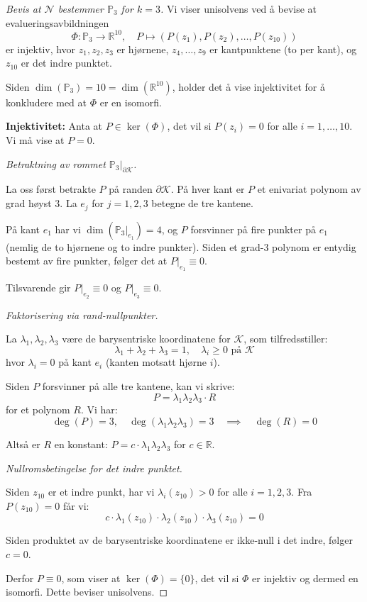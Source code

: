 \documentclass[../../main.tex]{subfiles}
\begin{document}
\begin{proof}[Bevis at $\mathcal{N}$ bestemmer $\mathbb{P}_3$ for $k=3$]
Vi viser unisolvens ved å bevise at evalueringsavbildningen
\[
    \Phi: \mathbb{P}_3 \to \mathbb{R}^{10}, \quad P \mapsto (P(z_1), P(z_2), \ldots, P(z_{10}))
\]
er injektiv, hvor $z_1, z_2, z_3$ er hjørnene, $z_4, \ldots, z_9$ er kantpunktene (to per kant), og $z_{10}$ er det indre punktet.

Siden $\dim(\mathbb{P}_3) = 10 = \dim(\mathbb{R}^{10})$, holder det å vise injektivitet for å konkludere med at $\Phi$ er en isomorfi.

\textbf{Injektivitet:} Anta at $P \in \ker(\Phi)$, det vil si $P(z_i) = 0$ for alle $i = 1, \ldots, 10$. Vi må vise at $P = 0$.

\textit{Betraktning av rommet $\mathbb{P}_3|_{\partial \mathcal{K}}$.}

La oss først betrakte $P$ på randen $\partial \mathcal{K}$. På hver kant er $P$ et enivariat polynom av grad høyst 3. La $e_j$ for $j = 1, 2, 3$ betegne de tre kantene.

På kant $e_1$ har vi $\dim(\mathbb{P}_3|_{e_1}) = 4$, og $P$ forsvinner på fire punkter på $e_1$ (nemlig de to hjørnene og to indre punkter). Siden et grad-3 polynom er entydig bestemt av fire punkter, følger det at $P|_{e_1} \equiv 0$.

Tilsvarende gir $P|_{e_2} \equiv 0$ og $P|_{e_3} \equiv 0$.

\textit{Faktorisering via rand-nullpunkter.}

La $\lambda_1, \lambda_2, \lambda_3$ være de barysentriske koordinatene for $\mathcal{K}$, som tilfredsstiller:
\[
    \lambda_1 + \lambda_2 + \lambda_3 = 1, \quad \lambda_i \geq 0 \text{ på } \mathcal{K}
\]
hvor $\lambda_i = 0$ på kant $e_i$ (kanten motsatt hjørne $i$).

Siden $P$ forsvinner på alle tre kantene, kan vi skrive:
\[
    P = \lambda_1 \lambda_2 \lambda_3 \cdot R
\]
for et polynom $R$. Vi har:
\[
    \deg(P) = 3, \quad \deg(\lambda_1 \lambda_2 \lambda_3) = 3 \quad \implies \quad \deg(R) = 0
\]

Altså er $R$ en konstant: $P = c \cdot \lambda_1 \lambda_2 \lambda_3$ for $c \in \mathbb{R}$.

\textit{Nullromsbetingelse for det indre punktet.}

Siden $z_{10}$ er et indre punkt, har vi $\lambda_i(z_{10}) > 0$ for alle $i = 1, 2, 3$. Fra $P(z_{10}) = 0$ får vi:
\[
    c \cdot \lambda_1(z_{10}) \cdot \lambda_2(z_{10}) \cdot \lambda_3(z_{10}) = 0
\]

Siden produktet av de barysentriske koordinatene er ikke-null i det indre, følger $c = 0$.

Derfor $P \equiv 0$, som viser at $\ker(\Phi) = \{0\}$, det vil si $\Phi$ er injektiv og dermed en isomorfi. Dette beviser unisolvens.
\end{proof}
\end{document}
